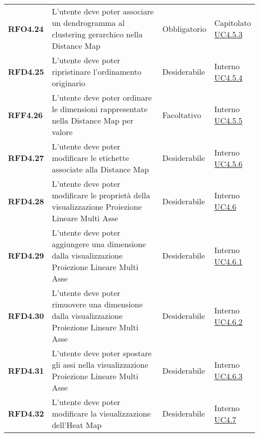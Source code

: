 \begin{longtable}[H]{>{\raggedright\bfseries}m{20mm} >{\raggedright}m{90mm} >{\raggedright}m{28mm} >{\raggedright\arraybackslash}m{30mm}}
    RFO4.24
    & L'utente deve poter associare un dendrogramma al clustering gerarchico nella Distance Map
    & Obbligatorio
    & \makecell{ Capitolato \\ \hyperref[par:uc4.5.2]{UC4.5.3} }\\

    RFD4.25
    & L'utente deve poter ripristinare l'ordinamento originario
    & Desiderabile
    & \makecell{ Interno \\ \hyperref[par:uc4.5.4]{UC4.5.4} }\\

    RFF4.26
    & L'utente deve poter ordinare le dimensioni rappresentate nella Distance Map per valore
    & Facoltativo
    & \makecell{ Interno \\ \hyperref[par:uc4.5.5]{UC4.5.5} }\\

    RFD4.27
    & L'utente deve poter modificare le etichette associate alla Distance Map
    & Desiderabile
    & \makecell{ Interno \\ \hyperref[par:uc4.5.6]{UC4.5.6} }\\

    RFD4.28
    & L'utente deve poter modificare le proprietà della visualizzazione Proiezione Lineare Multi Asse
    & Desiderabile
    & \makecell{ Interno \\  \hyperref[par:uc4.6.1]{UC4.6} }\\

    RFD4.29
    & L'utente deve poter aggiungere una dimensione dalla visualizzazione Proiezione Lineare Multi Asse
    & Desiderabile
    & \makecell{ Interno \\  \hyperref[par:uc4.6.1]{UC4.6.1} }\\

    RFD4.30
    & L'utente deve poter rimuovere una dimensione dalla visualizzazione Proiezione Lineare Multi Asse
    & Desiderabile
    & \makecell{ Interno \\  \hyperref[par:uc4.6.2]{UC4.6.2} }\\

    RFD4.31
    & L'utente deve poter spostare gli assi nella visualizzazione Proiezione Lineare Multi Asse
    & Desiderabile
    & \makecell{ Interno \\  \hyperref[par:uc4.6.3]{UC4.6.3} }\\

    RFD4.32
    & L'utente deve poter modificare la visualizzazione dell'Heat Map
    & Desiderabile
    & \makecell{ Interno \\  \hyperref[ssub:uc4.7]{UC4.7} }\\


\end{longtable}
